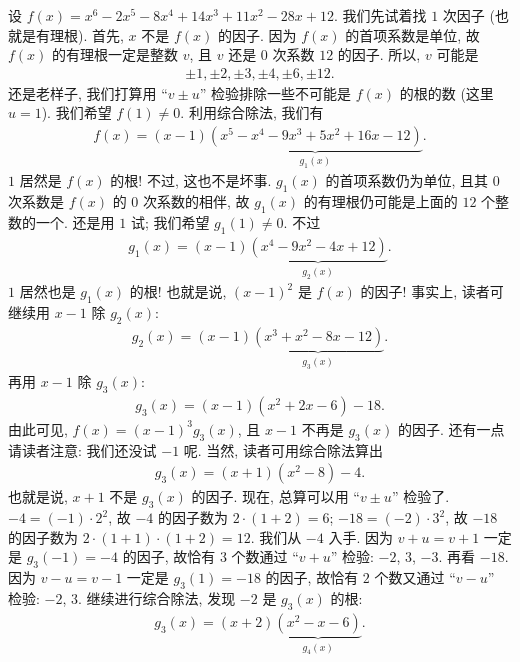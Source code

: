 \begin{example}
    设 $f(x) = x^6-2 x^5-8 x^4+14 x^3+11 x^2-28 x+12$. 我们先试着找 $1$ 次因子 (也就是有理根). 首先, $x$ 不是 $f(x)$ 的因子. 因为 $f(x)$ 的首项系数是单位, 故 $f(x)$ 的有理根一定是整数 $v$, 且 $v$ 还是 $0$ 次系数 $12$ 的因子. 所以, $v$ 可能是
    \begin{align*}
        \pm 1, \pm 2, \pm 3, \pm 4, \pm 6, \pm 12.
    \end{align*}
    还是老样子, 我们打算用 ``$v \pm u$'' 检验排除一些不可能是 $f(x)$ 的根的数 (这里 $u = 1$). 我们希望 $f(1) \neq 0$. 利用综合除法, 我们有
    \begin{align*}
        f(x) = (x - 1) \underbrace{(x^5-x^4-9 x^3+5 x^2+16 x-12)}_{g_1 (x)}.
    \end{align*}
    $1$ 居然是 $f(x)$ 的根! 不过, 这也不是坏事. $g_1 (x)$ 的首项系数仍为单位, 且其 $0$ 次系数是 $f(x)$ 的 $0$ 次系数的相伴, 故 $g_1 (x)$ 的有理根仍可能是上面的 $12$ 个整数的一个. 还是用 $1$ 试; 我们希望 $g_1 (1) \neq 0$. 不过
    \begin{align*}
        g_1 (x) = (x - 1) \underbrace{(x^4-9 x^2-4 x+12)}_{g_2 (x)}.
    \end{align*}
    $1$ 居然也是 $g_1 (x)$ 的根! 也就是说, $(x-1)^2$ 是 $f(x)$ 的因子! 事实上, 读者可继续用 $x-1$ 除 $g_2 (x)$:
    \begin{align*}
        g_2 (x) = (x - 1) \underbrace{(x^3+x^2-8 x-12)}_{g_3 (x)}.
    \end{align*}
    再用 $x-1$ 除 $g_3 (x)$:
    \begin{align*}
        g_3 (x) = (x - 1) (x^2 + 2x - 6) - 18.
    \end{align*}
    由此可见, $f(x) = (x-1)^3 g_3 (x)$, 且 $x-1$ 不再是 $g_3 (x)$ 的因子. 还有一点请读者注意: 我们还没试 $-1$ 呢. 当然, 读者可用综合除法算出
    \begin{align*}
        g_3 (x) = (x + 1)(x^2 - 8) - 4.
    \end{align*}
    也就是说, $x+1$ 不是 $g_3 (x)$ 的因子. 现在, 总算可以用 ``$v \pm u$'' 检验了. $-4 = (-1) \cdot 2^2$, 故 $-4$ 的因子数为 $2 \cdot (1+2) = 6$; $-18 = (-2) \cdot 3^2$, 故 $-18$ 的因子数为 $2 \cdot (1+1) \cdot (1+2) = 12$. 我们从 $-4$ 入手. 因为 $v + u = v + 1$ 一定是 $g_3 (-1) = -4$ 的因子, 故恰有 $3$ 个数通过 ``$v + u$'' 检验: $-2$, $3$, $-3$. 再看 $-18$. 因为 $v - u = v - 1$ 一定是 $g_3 (1) = -18$ 的因子, 故恰有 $2$ 个数又通过 ``$v - u$'' 检验: $-2$, $3$. 继续进行综合除法, 发现 $-2$ 是 $g_3 (x)$ 的根:
    \begin{align*}
        g_3 (x) = (x + 2) \underbrace{(x^2 - x - 6)}_{g_4 (x)}.

\end{align*}
\end{example}
